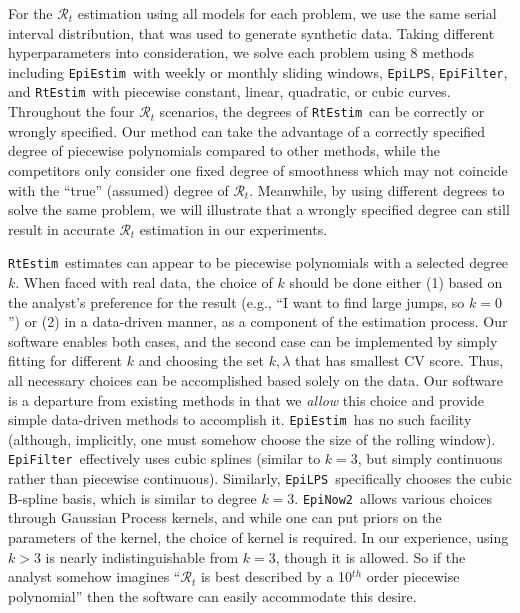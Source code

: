 \documentclass[10pt,letterpaper]{article}
\def\RtEstim{\texttt{RtEstim}}
\def\EpiEstim{\texttt{EpiEstim}}
\def\EpiLPS{\texttt{EpiLPS}}
\def\EpiFilter{\texttt{EpiFilter}}
\def\EpiNow2{\texttt{EpiNow2}}
\def\calR{\mathcal{R}}
\begin{document}
For the $\calR_t$ estimation using all models for each problem, we use the same serial 
interval distribution, that was used to generate synthetic data. Taking different 
hyperparameters into consideration, we solve each problem using 8 methods including 
\EpiEstim\ with weekly or monthly sliding windows, \EpiLPS, \EpiFilter, and 
\RtEstim\ with piecewise constant, linear, quadratic, or cubic curves. 
Throughout the four $\calR_t$ scenarios, the degrees of \RtEstim\ can be correctly or 
wrongly specified. Our method can take the advantage of a correctly specified 
degree of piecewise polynomials compared to other methods, while the competitors only 
consider one fixed degree of smoothness which may not coincide with the ``true'' 
(assumed) degree of $\calR_t$.
Meanwhile, by using different degrees to solve the same problem, we will illustrate 
that a wrongly specified degree can still result in accurate $\calR_t$ estimation 
in our experiments. 

\RtEstim\ estimates can appear to be piecewise polynomials with a selected degree 
$k$. %
When faced with real data, the choice of $k$ should be done either (1)
based on the analyst's preference for the result (e.g., ``I want to find
large jumps, so $k=0$'') or (2) in a data-driven manner, as a component of the
estimation process. Our software enables both cases, and the second case can be 
implemented by simply fitting for different $k$ and choosing the set $k,\lambda$ 
that has smallest CV score. Thus, all necessary choices can be accomplished based 
solely on the data. Our software is a departure from existing methods in that 
we \emph{allow} this choice and provide simple data-driven methods to accomplish it. 
\EpiEstim\ has no such facility (although, implicitly, one must somehow choose the 
size of the rolling window). \EpiFilter\ effectively uses cubic splines (similar to 
$k=3$, but simply continuous rather than piecewise continuous). Similarly, \EpiLPS\ 
specifically chooses the cubic B-spline basis, which is similar to degree $k=3$. 
\EpiNow2\ allows various choices through Gaussian Process kernels, and while one 
can put priors on the parameters of the kernel, the choice of kernel is required. 
In our experience, using $k > 3$ is nearly indistinguishable from $k=3$, though it 
is allowed. So if the analyst somehow imagines ``$\mathcal{R}_t$ is best described 
by a 10$^{th}$ order piecewise polynomial'' then the software can easily accommodate 
this desire. 
\end{document}
